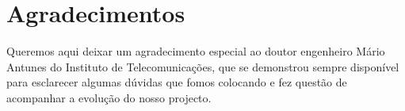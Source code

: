 \section{Agradecimentos}
Queremos aqui deixar um agradecimento especial ao doutor engenheiro Mário Antunes do Instituto de Telecomunicações, que se demonstrou sempre disponível para esclarecer algumas dúvidas que fomos colocando e fez questão de acompanhar a evolução do nosso projecto.
